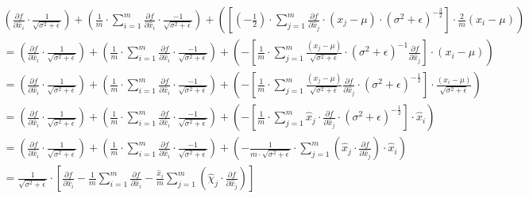 \documentclass[10pt]{article}
\begin{document}
\begin{enumerate}[label=(\alph*)]
\begin{equation}
\begin{array}{l}
{\left(\frac{\partial f}{\partial \hat{x}_{i}} \cdot \frac{1}{\sqrt{\sigma^{2}+\epsilon}}\right)+\left(\frac{1}{m} \cdot \sum_{i=1}^{m} \frac{\partial f}{\partial \hat{x}_{i}} \cdot \frac{-1}{\sqrt{\sigma^{2}+\epsilon}}\right)+ \left(\left[\left(-\frac{1}{2}\right) \cdot \sum_{j=1}^{m} \frac{\partial f}{\partial \hat{x}_{j}} \cdot\left(x_{j}-\mu\right) \cdot\left(\sigma^{2}+\epsilon\right)^{-\frac{3}{2}}\right] \cdot \frac{2}{m}\left(x_{i}-\mu\right)\right)} \\ {=\left(\frac{\partial f}{\partial \hat{x}_{i}} \cdot \frac{1}{\sqrt{\sigma^{2}+\epsilon}}\right)+\left(\frac{1}{m} \cdot \sum_{i=1}^{m} \frac{\partial f}{\partial \hat{x}_{i}} \cdot  \frac{-1}{\sqrt{\sigma^{2}+\epsilon}}\right)+\left(-\left[\frac{1}{m} \cdot \sum_{j=1}^{m} \frac{\left(x_{j}-\mu\right)}{\sqrt{\sigma^{2}+\epsilon}} \cdot\left(\sigma^{2}+\epsilon\right)^{-1} \frac{\partial f}{\partial \hat{x}_{j}}\right] \cdot\left(x_{i}-\mu\right)\right)} \\ {=\left(\frac{\partial f}{\partial \hat{x}_{i}} \cdot \frac{1}{\sqrt{\sigma^{2}+\epsilon}}\right)+\left(\frac{1}{m} \cdot \sum_{i=1}^{m} \frac{\partial f}{\partial \hat{x}_{i}} \cdot \frac{-1}{\sqrt{\sigma^{2}+\epsilon}}\right)+\left(-\left[\frac{1}{m} \cdot \sum_{j=1}^{m} \frac{\left(x_{j}-\mu\right)}{\sqrt{\sigma^{2}+\epsilon}} \frac{\partial f}{\partial \hat{x}_{j}} \cdot\left(\sigma^{2}+\epsilon\right)^{-\frac{1}{2}}\right] \cdot \frac{\left(x_{i}-\mu\right)}{\sqrt{\sigma^{2}+\epsilon}}\right)}\\
{=\left(\frac{\partial f}{\partial \hat{x}_{i}} \cdot \frac{1}{\sqrt{\sigma^{2}+\epsilon}}\right)+\left(\frac{1}{m} \cdot \sum_{i=1}^{m} \frac{\partial f}{\partial \hat{x}_{i}} \cdot \frac{-1}{\sqrt{\sigma^{2}+\epsilon}}\right)+\left(-\left[\frac{1}{m} \cdot \sum_{j=1}^{m} \hat{x}_{j} \cdot \frac{\partial f}{\partial \hat{x}_{j}} \cdot\left(\sigma^{2}+\epsilon\right)^{-\frac{1}{2}}\right] \cdot \hat{x}_{i}\right)} \\ {=\left(\frac{\partial f}{\partial \hat{x}_{i}} \cdot \frac{1}{\sqrt{\sigma^{2}+\epsilon}}\right)+\left(\frac{1}{m} \cdot \sum_{i=1}^{m} \frac{\partial f}{\partial \hat{x}_{i}} \cdot \frac{-1}{\sqrt{\sigma^{2}+\epsilon}}\right)+\left(-\frac{1}{m \cdot \sqrt{\sigma^{2}+\epsilon}} \cdot \sum_{j=1}^{m}\left(\hat{x}_{j} \cdot \frac{\partial f}{\partial \hat{x}_{j}}\right) \cdot \hat{x}_{i}\right)} \\ {=\frac{1}{\sqrt{\sigma^{2}+\epsilon}} \cdot\left[\frac{\partial f}{\partial \hat{x}_{i}}-\frac{1}{m} \sum_{i=1}^{m} \frac{\partial f}{\partial \hat{x}_{i}}-\frac{\hat{x}_{i}}{m} \sum_{j=1}^{m}\left(\hat{\chi}_{j} \cdot \frac{\partial f}{\partial \hat{x}_{j}}\right)\right]}
\end{array}
\end{equation}
\end{enumerate}
\end{document}
